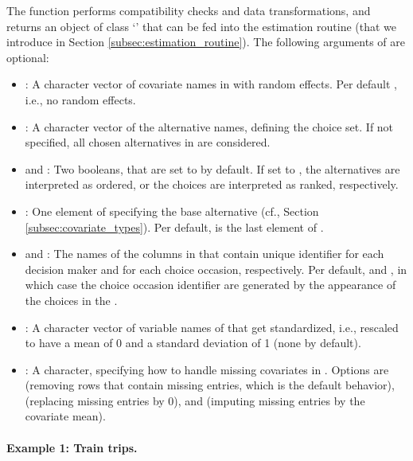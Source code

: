 \documentclass[article,shortnames]{jss}
\newcommand{\class}[1]{`\code{#1}'}
\newcommand{\fct}[1]{\code{#1()}}
\begin{document}
The function performs compatibility checks and data transformations, and returns an object of class \class{RprobitB\_data} that can be fed into the estimation routine \fct{fit\_model} (that we introduce in Section \ref{subsec:estimation_routine}). The following arguments of \fct{prepare\_data} are optional:
\begin{itemize}
  \item {}: A character vector of covariate names in  with random effects. Per default , i.e., no random effects.
  \item {}: A character vector of the alternative names, defining the choice set. If not specified, all chosen alternatives in  are considered.
  \item {} and : Two booleans, that are set to  by default. If set to , the alternatives are interpreted as ordered, or the choices are interpreted as ranked, respectively.
  \item {}: One element of  specifying the base alternative (cf., Section \ref{subsec:covariate_types}). Per default,  is the last element of .
  \item {} and : The names of the columns in  that contain unique identifier for each decision maker and for each choice occasion, respectively. Per default,  and , in which case the choice occasion identifier are generated by the appearance of the choices in the .
  \item {}: A character vector of variable names of  that get standardized, i.e., rescaled to have a mean of 0 and a standard deviation of 1 (none by default).
  \item {}: A character, specifying how to handle missing covariates in . Options are  (removing rows that contain missing entries, which is the default behavior),  (replacing missing entries by 0), and  (imputing missing entries by the covariate mean).
\end{itemize}

\paragraph{Example 1: Train trips.}
\end{document}
